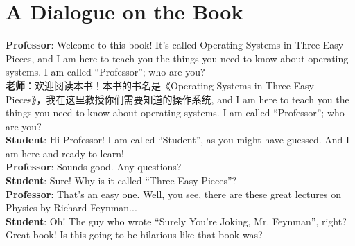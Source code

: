 
\section{A Dialogue on the Book}
\noindent\textbf{Professor}: Welcome to this book! It’s called Operating
Systems in Three Easy Pieces, and I am here to teach you the things you need to
know about operating systems. I am called “Professor”; who are you? \\
\noindent\textbf{老师}：欢迎阅读本书！本书的书名是《Operating Systems in Three
Easy Pieces》，我在这里教授你们需要知道的操作系统, and I am here to teach you the things you need to
know about operating systems. I am called “Professor”; who are you? \\
\noindent\textbf{Student}: Hi Professor! I am called “Student”, as you might
have guessed. And I am here and ready to learn! \\
\noindent\textbf{Professor}: Sounds good. Any questions? \\
\noindent\textbf{Student}: Sure! Why is it called “Three Easy Pieces”? \\
\noindent\textbf{Professor}: That’s an easy one. Well, you see, there are these
great lectures on Physics by Richard Feynman... \\
\noindent\textbf{Student}: Oh! The guy who wrote “Surely You’re Joking, Mr.
Feynman”, right? Great book! Is this going to be hilarious like that book was?

